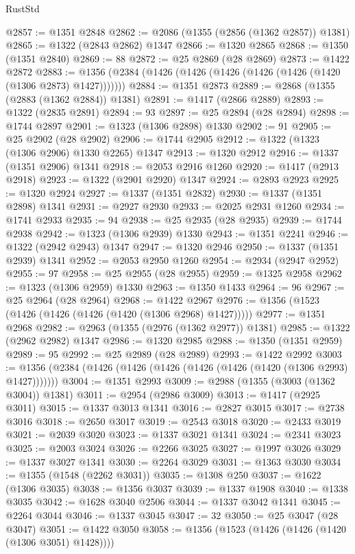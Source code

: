 \begin{lexlean}{RustStd}
\begin{coremodule}
{\begin{coremodule}
{{{{{{{{{{{{{{{{{{{{{{{{{{{{{{{{{{@2857 := @1351 @2848
@2862 := @2086 (@1355 (@2856 (@1362 @2857)) @1381)
@2865 := @1322 (@2843 @2862) @1347
@2866 := @1320 @2865
@2868 := @1350 (@1351 @2840)
@2869 := 88
@2872 := @25 @2869 (@28 @2869)
@2873 := @1422 @2872
@2883 := @1356 (@2384 (@1426 (@1426 (@1426 (@1426 (@1426 (@1420 (@1306 @2873) @1427)))))))
@2884 := @1351 @2873
@2889 := @2868 (@1355 (@2883 (@1362 @2884)) @1381)
@2891 := @1417 (@2866 @2889)
@2893 := @1322 (@2835 @2891)
@2894 := 93
@2897 := @25 @2894 (@28 @2894)
@2898 := @1744 @2897
@2901 := @1323 (@1306 @2898) @1330
@2902 := 91
@2905 := @25 @2902 (@28 @2902)
@2906 := @1744 @2905
@2912 := @1322 (@1323 (@1306 @2906) @1330 @2265) @1347
@2913 := @1320 @2912
@2916 := @1337 (@1351 @2906) @1341
@2918 := @2053 @2916 @1260
@2920 := @1417 (@2913 @2918)
@2923 := @1322 (@2901 @2920) @1347
@2924 := @2893 @2923
@2925 := @1320 @2924
@2927 := @1337 (@1351 @2832)
@2930 := @1337 (@1351 @2898) @1341
@2931 := @2927 @2930
@2933 := @2025 @2931 @1260
@2934 := @1741 @2933
@2935 := 94
@2938 := @25 @2935 (@28 @2935)
@2939 := @1744 @2938
@2942 := @1323 (@1306 @2939) @1330
@2943 := @1351 @2241
@2946 := @1322 (@2942 @2943) @1347
@2947 := @1320 @2946
@2950 := @1337 (@1351 @2939) @1341
@2952 := @2053 @2950 @1260
@2954 := @2934 (@2947 @2952)
@2955 := 97
@2958 := @25 @2955 (@28 @2955)
@2959 := @1325 @2958
@2962 := @1323 (@1306 @2959) @1330
@2963 := @1350 @1433
@2964 := 96
@2967 := @25 @2964 (@28 @2964)
@2968 := @1422 @2967
@2976 := @1356 (@1523 (@1426 (@1426 (@1426 (@1420 (@1306 @2968) @1427)))))
@2977 := @1351 @2968
@2982 := @2963 (@1355 (@2976 (@1362 @2977)) @1381)
@2985 := @1322 (@2962 @2982) @1347
@2986 := @1320 @2985
@2988 := @1350 (@1351 @2959)
@2989 := 95
@2992 := @25 @2989 (@28 @2989)
@2993 := @1422 @2992
@3003 := @1356 (@2384 (@1426 (@1426 (@1426 (@1426 (@1426 (@1420 (@1306 @2993) @1427)))))))
@3004 := @1351 @2993
@3009 := @2988 (@1355 (@3003 (@1362 @3004)) @1381)
@3011 := @2954 (@2986 @3009)
@3013 := @1417 (@2925 @3011)
@3015 := @1337 @3013 @1341
@3016 := @2827 @3015
@3017 := @2738 @3016
@3018 := @2650 @3017
@3019 := @2543 @3018
@3020 := @2433 @3019
@3021 := @2039 @3020
@3023 := @1337 @3021 @1341
@3024 := @2341 @3023
@3025 := @2003 @3024
@3026 := @2266 @3025
@3027 := @1997 @3026
@3029 := @1337 @3027 @1341
@3030 := @2264 @3029
@3031 := @1363 @3030
@3034 := @1355 (@1548 (@2262 @3031))
@3035 := @1308 @250
@3037 := @1622 (@1306 @3035)
@3038 := @1356 @3037
@3039 := @1337 @1908
@3040 := @1338 @3035
@3042 := @1628 @3040 @2506
@3044 := @1337 @3042 @1341
@3045 := @2264 @3044
@3046 := @1337 @3045
@3047 := 32
@3050 := @25 @3047 (@28 @3047)
@3051 := @1422 @3050
@3058 := @1356 (@1523 (@1426 (@1426 (@1420 (@1306 @3051) @1428))))
}}}}}}}}}}}}}}}}}}}}}}}}}}}}}}}}}}
\end{coremodule}}
\end{coremodule}
\end{lexlean}
